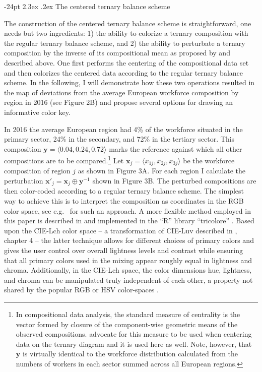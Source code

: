 \documentclass[10pt, twoside, parskip=half]{article}
\makeatletter
\renewcommand\section{\@startsection {section}{1}{\z@}%
                                   {-24pt}%
                                   {2.3ex \@plus.2ex}%
                                   {\normalfont\large\bfseries}}
\makeatother
\begin{document}
\hypertarget{the-centered-ternary-balance-scheme}{%
\section{The centered ternary balance
scheme}\label{the-centered-ternary-balance-scheme}}

The construction of the centered ternary balance scheme is
straightforward, one needs but two ingredients: 1) the ability to
colorize a ternary composition with the regular ternary balance scheme,
and 2) the ability to perturbate a ternary composition by the inverse of
its compositional mean as proposed by \citet{VonEynatten2002} and
described above. One first performs the centering of the compositional
data set and then colorizes the centered data according to the regular
ternary balance scheme. In the following, I will demonstrate how these
two operations resulted in the map of deviations from the average
European workforce composition by region in 2016 (see Figure 2B) and
propose several options for drawing an informative color key.

In 2016 the average European region had 4\% of the workforce situated in
the primary sector, 24\% in the secondary, and 72\% in the tertiary
sector. This composition \(\mathbf{y}=\langle 0.04, 0.24, 0.72 \rangle\)
marks the reference against which all other compositions are to be
compared.\footnote{In compositional data analysis, the standard measure
  of centrality is the vector formed by closure of the component-wise
  geometric means of the observed compositions. \citet{VonEynatten2002}
  advocate for this measure to be used when centering data on the
  ternary diagram and it is used here as well. Note, however, that
  \(\mathbf{y}\) is virtually identical to the workforce distribution
  calculated from the numbers of workers in each sector summed across
  all European regions.} Let
\(\mathbf{x}_j = \langle x_{1j}, x_{2j}, x_{3j} \rangle\) be the
workforce composition of region \(j\) as shown in Figure 3A. For each
region I calculate the perturbation
\(\mathbf{x}'_j = \mathbf{x}_j \oplus \mathbf{y}^{-1}\) shown in Figure
3B. The perturbed compositions are then color-coded according to a
regular ternary balance scheme. The simplest way to achieve this is to
interpret the composition as coordinates in the RGB color space, see
e.g.~\citet{Wang2009} for such an approach. A more flexible method
employed in this paper is described in \citet{Schoeley2017} and
implemented in the ``R'' library ``tricolore'' \citep{Schoeley2019a}.
Based upon the CIE-Lch color space -- a transformation of CIE-Luv
described in \citet{Ware2013}, chapter 4 -- the latter technique allows
for different choices of primary colors and gives the user control over
overall lightness levels and contrast while ensuring that all primary
colors used in the mixing appear roughly equal in lightness and chroma.
Additionally, in the CIE-Lch space, the color dimensions hue, lightness,
and chroma can be manipulated truly independent of each other, a
property not shared by the popular RGB or HSV color-spaces
\citep{Zeileis2009}.
\end{document}
